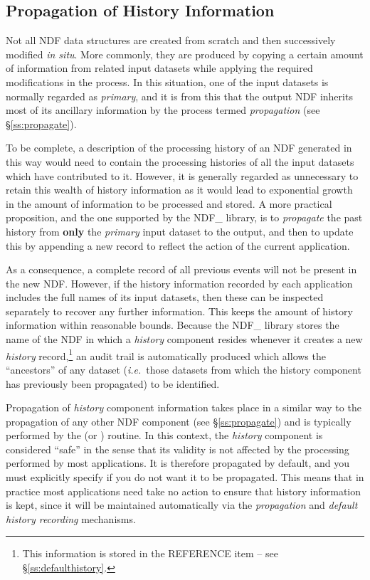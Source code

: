 \documentclass[twoside,11pt,nolof]{starlink}
\providecommand{\st}[1]{{\emph{#1}}}
\begin{document}
\subsection{Propagation of History Information}

Not all NDF data structures are created from scratch and then
successively modified \st{in situ}. More commonly, they are produced
by copying a certain amount of information from related input datasets
while applying the required modifications in the process.  In this
situation, one of the input datasets is normally regarded as
\st{primary\/}, and it is from this that the output NDF inherits most
of its
ancillary information by the process termed \st{propagation\/} (see
\S\ref{ss:propagate}).

To be complete, a description of the processing history of an NDF
generated in this way would need to contain the processing histories
of all the input datasets which have contributed to it. However, it is
generally regarded as unnecessary to retain this wealth of history
information as it would lead to exponential growth in the amount of
information to be processed and stored.  A more practical proposition,
and the one supported by the NDF\_ library, is to \st{propagate\/} the
past history from \textbf{only} the \st{primary\/} input dataset to the
output, and then to update this by appending a new record to reflect
the action of the current application.

As a consequence, a complete record of all previous events will not be
present in the new NDF. However, if the history information recorded
by each application includes the full names of its input datasets,
then these can be inspected separately to recover any further
information. This keeps the amount of history information within
reasonable bounds.  Because the NDF\_ library stores the name of the
NDF in which a \st{history\/} component resides whenever it creates a
new \st{history\/} record,\footnote{This information is stored in the
REFERENCE item -- see \S\ref{ss:defaulthistory}.} an audit trail is
automatically produced which allows the ``ancestors'' of any dataset
(\st{i.e.}\ those datasets from which the history component has
previously been propagated) to be identified.

Propagation of \st{history\/} component information takes place in a
similar way to the propagation of any other NDF component (see
\S\ref{ss:propagate}) and is typically performed by the  (or
) routine. In this context, the \st{history\/} component is
considered ``safe'' in the sense that its validity is not affected by
the processing performed by most applications. It is therefore
propagated by default, and you must explicitly specify if you do not
want it to be propagated. This means that in practice most
applications need take no action to ensure that history information is
kept, since it will be maintained automatically via the
\st{propagation\/} and \st{default history recording\/} mechanisms.
\end{document}

